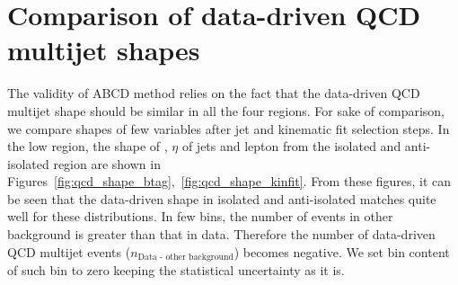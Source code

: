\section{Comparison of data-driven QCD multijet shapes}
The validity of ABCD method relies on the fact that the data-driven QCD multijet shape should be 
similar in all the four regions. For sake of comparison, we compare shapes of few variables after
\PQb jet and kinematic fit selection steps. In the low \MET region, the shape of \pt, $\eta$ of 
jets and lepton from the isolated and anti-isolated region are shown in 
Figures~\ref{fig:qcd_shape_btag},~\ref{fig:qcd_shape_kinfit}. From these figures, it can be seen that 
the data-driven shape in isolated and anti-isolated matches quite well for these distributions. In few
bins, the number of events in other background is greater than that in data. Therefore the number of
data-driven QCD multijet events ($n_{\text{Data - other background}}$) becomes negative. We set bin 
content of such bin to zero keeping the statistical uncertainty as it is. 
